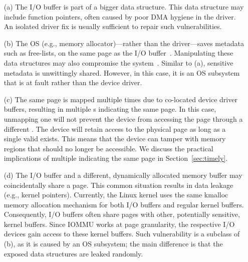 \begin{enumerate}
    \item[(a)] The I/O buffer is part of a bigger data structure. This data structure may include function pointers, often caused by poor DMA hygiene in the driver. An isolated driver fix is usually sufficient to repair such vulnerabilities.
    \item[(b)] The OS (e.g., memory allocator)---rather than the driver---saves metadata such as free-lists, on the same page as the I/O buffer~\cite{Cor07}. Manipulating these data structures may also compromise the system~\cite{ak09}. Similar to (a), sensitive metadata is unwittingly shared. However, in this case, it is an OS subsystem that is at fault rather than the device driver.
    \item[(c)] The same page is mapped multiple times due to co-located device driver buffers, resulting in multiple \iova{}s indicating the same page. 
    In this case, unmapping one \iova will not prevent the device from accessing the page through a different \iova.
    The device will retain access to the physical page as long as a single valid \iova{} exists. This means that the device can tamper with memory regions that should no longer be accessible. We discuss the practical implications of multiple \iova indicating the same page in Section~\ref{sec:timely}.
    \item[(d)] The I/O buffer and a different, dynamically allocated memory buffer may coincidentally share a page. This common situation results in data leakage (e.g., kernel pointers). Currently, the Linux kernel uses the same kmalloc memory allocation mechanism for both I/O buffers and regular kernel buffers. Consequently, I/O buffers often share pages with other, potentially sensitive, kernel buffers. Since IOMMU works at page granularity, the respective I/O devices gain access to these kernel buffers. Such vulnerability is a subclass of (b), as it is caused by an OS subsystem; the main difference is that the exposed data structures are leaked randomly.
\end{enumerate}

